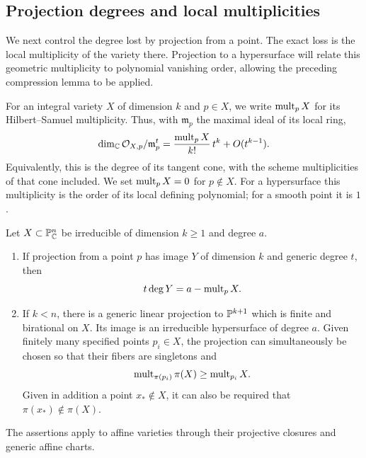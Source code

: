 \subsection{Projection degrees and local multiplicities}

We next control the degree lost by projection from a point.  The exact
loss is the local multiplicity of the variety there.  Projection to a
hypersurface will relate this geometric multiplicity to polynomial
vanishing order, allowing the preceding compression lemma to be applied.

For an integral variety $X$ of dimension $k$ and $p\in X$, we write
$\operatorname{mult}_pX$ for its Hilbert--Samuel multiplicity.  Thus, with
$\mathfrak m_p$ the maximal ideal of its local ring,
\[
 \dim_{\mathbb C}\mathcal O_{X,p}/\mathfrak m_p^t
       =\frac{\operatorname{mult}_pX}{k!}\,t^k+O(t^{k-1}).
\]
Equivalently, this is the degree of its tangent cone, with the scheme
multiplicities of that cone included.  We set $\operatorname{mult}_pX=0$ for
$p\notin X$.  For a hypersurface this multiplicity is the order of
its local defining polynomial; for a smooth point it is $1$.

\begin{lemma}\label{poly:projection}
Let $X\subset\mathbb P^n_{\mathbb C}$ be irreducible of dimension $k\ge1$ and
degree $a$.
\begin{enumerate}[label=(\roman*)]
\item If projection from a point $p$ has image $Y$ of dimension $k$
and generic degree $t$, then
\begin{equation}\label{poly:point-projection-formula}
 t\deg Y=a-\operatorname{mult}_pX.
\end{equation}
\item If $k<n$, there is a generic linear projection to
$\mathbb P^{k+1}$ which is finite and birational on $X$.  Its image is an
irreducible hypersurface of degree $a$.  Given finitely many specified
points $p_i\in X$, the projection can simultaneously be chosen so
that their fibers are singletons and
\begin{equation}\label{poly:projection-multiplicity}
 \operatorname{mult}_{\pi(p_i)}\pi(X)\ge\operatorname{mult}_{p_i}X.
\end{equation}
Given in addition a point $x_*\notin X$, it can also be required that
$\pi(x_*)\notin\pi(X)$.
\end{enumerate}
The assertions apply to affine varieties through their projective
closures and generic affine charts.
\end{lemma}

